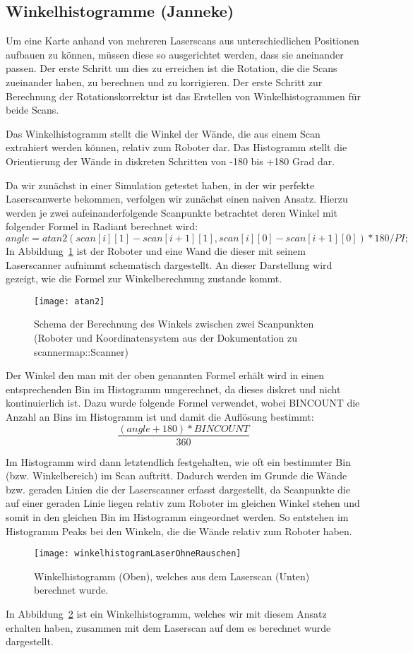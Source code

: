 \subsection{Winkelhistogramme (Janneke)}
\label{sec:winkelhistogramme}

Um eine Karte anhand von mehreren Laserscans aus unterschiedlichen Positionen aufbauen zu können, müssen diese so ausgerichtet werden, dass sie aneinander passen. Der erste Schritt um dies zu erreichen ist die Rotation, die die Scans zueinander haben, zu berechnen und zu korrigieren. Der erste Schritt zur Berechnung der Rotationskorrektur ist das Erstellen von Winkelhistogrammen für beide Scans.

Das Winkelhistogramm stellt die Winkel der Wände, die aus einem Scan extrahiert werden können, relativ zum Roboter dar. Das Histogramm stellt die Orientierung der Wände in diskreten Schritten von -180 bis +180 Grad dar.

Da wir zunächst in einer Simulation getestet haben, in der wir perfekte Laserscanwerte bekommen, verfolgen wir zunächst einen naiven Ansatz. Hierzu werden je zwei aufeinanderfolgende Scanpunkte betrachtet deren Winkel mit folgender Formel in Radiant berechnet wird: $$angle = atan2(scan[i][1] - scan[i+1][1], scan[i][0] - scan[i+1][0]) * 180 /PI;$$ In Abbildung~\ref{fig:Winkelberechnung} ist der Roboter und eine Wand die dieser mit seinem Laserscanner aufnimmt schematisch dargestellt. An dieser Darstellung wird gezeigt, wie die Formel zur Winkelberechnung zustande kommt.

\begin{figure}
	\centering
	\texttt{[image: atan2]}
	\caption{Schema der Berechnung des Winkels zwischen zwei Scanpunkten (Roboter und Koordinatensystem aus der Dokumentation zu scannermap::Scanner)}
	\label{fig:Winkelberechnung}
\end{figure}

Der Winkel den man mit der oben genannten Formel erhält wird in einen entsprechenden Bin im Histogramm umgerechnet, da dieses diskret und nicht kontinuierlich ist. Dazu wurde folgende Formel verwendet, wobei BINCOUNT die Anzahl an Bins im Histogramm ist und damit die Auflösung bestimmt: $$\frac{(angle + 180) * BINCOUNT}{360}$$

Im Histogramm wird dann letztendlich festgehalten, wie oft ein bestimmter Bin (bzw. Winkelbereich) im Scan auftritt. Dadurch werden im Grunde die Wände bzw. geraden Linien die der Laserscanner erfasst dargestellt, da Scanpunkte die auf einer geraden Linie liegen relativ zum Roboter im gleichen Winkel stehen und somit in den gleichen Bin im Histogramm eingeordnet werden. So entstehen im Histogramm Peaks bei den Winkeln, die die Wände relativ zum Roboter haben.

\begin{figure}
	\centering
	\texttt{[image: winkelhistogramLaserOhneRauschen]}
	\caption{Winkelhistogramm (Oben), welches aus dem Laserscan (Unten) berechnet wurde.}
	\label{fig:Winkelhistogramm}
\end{figure}

In Abbildung~\ref{fig:Winkelhistogramm} ist ein Winkelhistogramm, welches wir mit diesem Ansatz erhalten haben, zusammen mit dem Laserscan auf dem es berechnet wurde dargestellt.